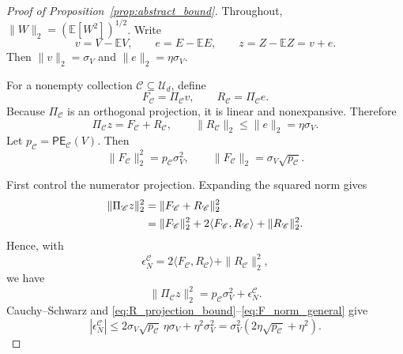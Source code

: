 \documentclass[11pt,letterpaper]{article}
\newcommand{\E}{\mathbb{E}}
\theoremstyle{remark}
\begin{document}
\begin{proof}[Proof of Proposition~\ref{prop:abstract_bound}]
Throughout, $\|W\|_2=(\E[W^2])^{1/2}$. Write
\begin{equation}
  v=V-\E V,
  \qquad
  e=E-\E E,
  \qquad
  z=Z-\E Z=v+e.
\end{equation}
Then $\|v\|_2=\sigma_V$ and $\|e\|_2=\eta\sigma_V$.

For a nonempty collection $\mathscr C\subseteq\mathcal U_d$, define
\begin{equation}
  F_{\mathscr C}=\Pi_{\mathscr C}v,
  \qquad
  R_{\mathscr C}=\Pi_{\mathscr C}e.
\end{equation}
Because $\Pi_{\mathscr C}$ is an orthogonal projection, it is linear and
nonexpansive. Therefore
\begin{equation}
  \Pi_{\mathscr C}z=F_{\mathscr C}+R_{\mathscr C},
  \qquad
  \|R_{\mathscr C}\|_2\leq\|e\|_2=\eta\sigma_V.
  \label{eq:R_projection_bound}
\end{equation}
Let $p_{\mathscr C}=\mathsf{PE}_{\mathscr C}(V)$. Then
\begin{equation}
  \|F_{\mathscr C}\|_2^2=p_{\mathscr C}\sigma_V^2,
  \qquad
  \|F_{\mathscr C}\|_2=\sigma_V\sqrt{p_{\mathscr C}}.
  \label{eq:F_norm_general}
\end{equation}

First control the numerator projection. Expanding the squared norm gives
\begin{align}
  \|\Pi_{\mathscr C}z\|_2^2
  &=\|F_{\mathscr C}+R_{\mathscr C}\|_2^2
  \notag\\
  &=\|F_{\mathscr C}\|_2^2
    +2\langle F_{\mathscr C},R_{\mathscr C}\rangle
    +\|R_{\mathscr C}\|_2^2.
\end{align}
Hence, with
\begin{equation}
  \epsilon_N^{\mathscr C}
  =2\langle F_{\mathscr C},R_{\mathscr C}\rangle
   +\|R_{\mathscr C}\|_2^2,
\end{equation}
we have
\begin{equation}
  \|\Pi_{\mathscr C}z\|_2^2
  =p_{\mathscr C}\sigma_V^2+
    \epsilon_N^{\mathscr C}.
\end{equation}
Cauchy--Schwarz and \eqref{eq:R_projection_bound}--\eqref{eq:F_norm_general}
give
\begin{equation}
  |\epsilon_N^{\mathscr C}|
  \leq
  2\sigma_V\sqrt{p_{\mathscr C}}\,\eta\sigma_V
  +\eta^2\sigma_V^2
  =\sigma_V^2(2\eta\sqrt{p_{\mathscr C}}+\eta^2).
  \label{eq:epsN_general_bound}
\end{equation}


\end{proof}
\end{document}
